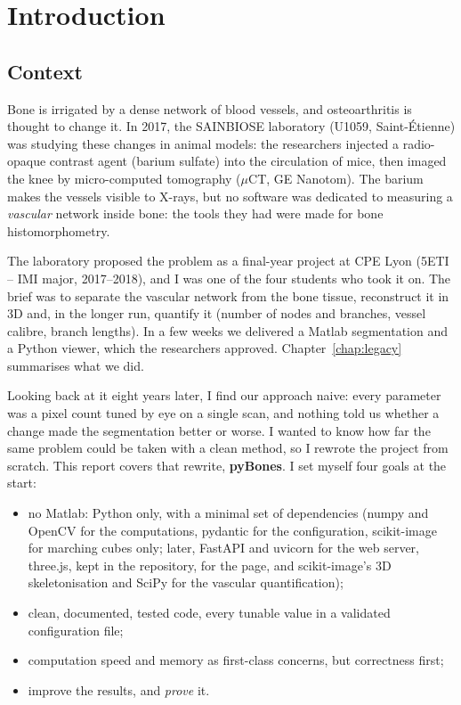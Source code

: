 \chapter{Introduction}

\section{Context}

Bone is irrigated by a dense network of blood vessels, and osteoarthritis is thought to change it.
In 2017, the SAINBIOSE laboratory (U1059, Saint-Étienne) was studying these changes in animal models:
the researchers injected a radio-opaque contrast agent (barium sulfate) into the circulation of mice,
then imaged the knee by micro-computed tomography ($\mu$CT, GE Nanotom). The barium makes the vessels
visible to X-rays, but no software was dedicated to measuring a \emph{vascular} network inside bone:
the tools they had were made for bone histomorphometry.

The laboratory proposed the problem as a final-year project at CPE Lyon (5ETI -- IMI major,
2017--2018), and I was one of the four students who took it on. The brief was to separate the vascular
network from the bone tissue, reconstruct it in 3D and, in the longer run, quantify it (number of nodes
and branches, vessel calibre, branch lengths). In a few weeks we delivered a Matlab segmentation and a
Python viewer, which the researchers approved. Chapter~\ref{chap:legacy} summarises what we did.

Looking back at it eight years later, I find our approach naive: every parameter was a pixel count tuned
by eye on a single scan, and nothing told us whether a change made the segmentation better or worse.
I wanted to know how far the same problem could be taken with a clean method, so I rewrote the project
from scratch. This report covers that rewrite, \textbf{pyBones}. I set myself four goals at the start:
\begin{itemize}
  \item no Matlab: Python only, with a minimal set of dependencies (numpy and OpenCV for the
        computations, pydantic for the configuration, scikit-image for marching cubes only; later,
        FastAPI and uvicorn for the web server, three.js, kept in the repository, for the page, and
        scikit-image's 3D skeletonisation and SciPy for the vascular quantification);
  \item clean, documented, tested code, every tunable value in a validated configuration file;
  \item computation speed and memory as first-class concerns, but correctness first;
  \item improve the results, and \emph{prove} it.
\end{itemize}

